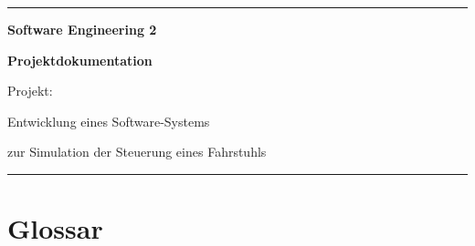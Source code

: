 

\begin{titlepage}
	\vspace*{\fill}

	\rule{\textwidth}{0.25pt}

	\vspace*{1cm}

	\begin{singlespace}
		\begin{center}	\Large	\bfseries
			Software Engineering 2
		\end{center}
	\end{singlespace}

	\vspace{1em}

	\begin{singlespace}
		\begin{center}	\Large \bfseries
		Projektdokumentation
		
		\vspace{2em}	\large
		Projekt:
		
		Entwicklung eines Software-Systems
		
		zur Simulation der Steuerung eines Fahrstuhls
		\end{center}
	\end{singlespace}

	\vspace*{5cm}

	\rule{\textwidth}{0.25pt}

	\vspace*{\fill}
\end{titlepage}


\tableofcontents






\chapter{Glossar}
\glsaddall %
\nocite{*} %
\printglossary[title=Allgemeiner Glossar, toctitle=Allgemeiner Glossar, type=allg]
\printglossary[title=Projektspezifischer Glossar, toctitle=Projektspezifischer Glossar]

